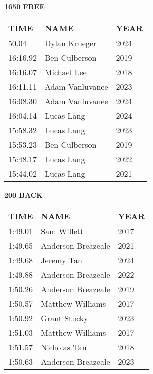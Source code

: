 \begin{minipage}[t]{0.48\textwidth}
\centering
\textbf{1650 FREE}\\[0.05cm]
\begin{tabular}{@{}p{1.8cm}p{2.8cm}p{1.2cm}@{}}
\hline
\textbf{TIME} & \textbf{NAME} & \textbf{YEAR} \\
\hline
50.04 & Dylan Krueger & 2024 \\
16:16.92 & Ben Culberson & 2019 \\
16:16.07 & Michael Lee & 2018 \\
16:11.11 & Adam Vanluvanee & 2023 \\
16:08.30 & Adam Vanluvanee & 2024 \\
16:04.14 & Lucas Lang & 2024 \\
15:58.32 & Lucas Lang & 2023 \\
15:53.23 & Ben Culberson & 2019 \\
15:48.17 & Lucas Lang & 2022 \\
15:44.02 & Lucas Lang & 2021 \\
\hline
\end{tabular}
\end{minipage}\hfill
\begin{minipage}[t]{0.48\textwidth}
\centering
\textbf{200 BACK}\\[0.05cm]
\begin{tabular}{@{}p{1.8cm}p{2.8cm}p{1.2cm}@{}}
\hline
\textbf{TIME} & \textbf{NAME} & \textbf{YEAR} \\
\hline
1:49.01 & Sam Willett & 2017 \\
1:49.65 & Anderson Breazeale & 2021 \\
1:49.68 & Jeremy Tan & 2024 \\
1:49.88 & Anderson Breazeale & 2022 \\
1:50.26 & Anderson Breazeale & 2019 \\
1:50.57 & Matthew Williams & 2017 \\
1:50.92 & Grant Stucky & 2023 \\
1:51.03 & Matthew Williams & 2017 \\
1:51.57 & Nicholas Tan & 2018 \\
1:50.63 & Anderson Breazeale & 2023 \\
\hline
\end{tabular}
\end{minipage}

\vspace{0.4cm}

